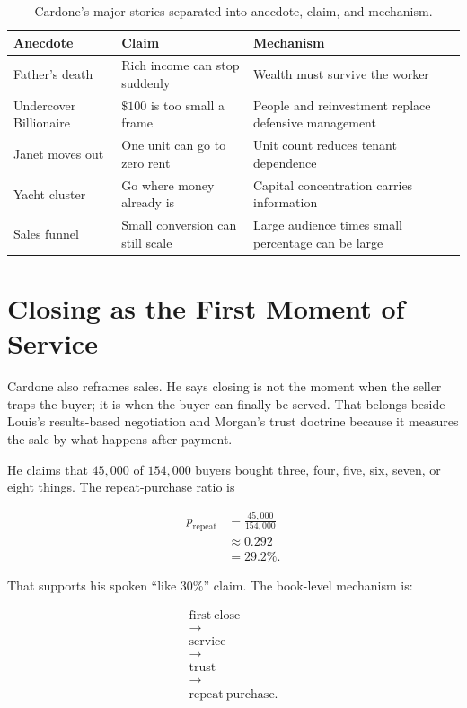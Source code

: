 \documentclass[11pt,oneside]{book}
\begin{document}
\begin{table}
\centering
\begin{tabular}{p{.22\linewidth}p{.32\linewidth}p{.34\linewidth}}
\hline
Anecdote & Claim & Mechanism\\
\hline
Father's death & Rich income can stop suddenly & Wealth must survive the worker\\
\hline
Undercover Billionaire & \(\$100\) is too small a frame & People and reinvestment replace defensive management\\
\hline
Janet moves out & One unit can go to zero rent & Unit count reduces tenant dependence\\
\hline
Yacht cluster & Go where money already is & Capital concentration carries information\\
\hline
Sales funnel & Small conversion can still scale & Large audience times small percentage can be large\\
\hline
\end{tabular}
\caption{Cardone's major stories separated into anecdote, claim, and mechanism.}
\end{table}

\section{Closing as the First Moment of Service}

Cardone also reframes sales. He says closing is not the moment when the seller traps the buyer; it is when the buyer can finally be served. That belongs beside Louis's results-based negotiation and Morgan's trust doctrine because it measures the sale by what happens after payment.

He claims that \(45{,}000\) of \(154{,}000\) buyers bought three, four, five, six, seven, or eight things. The repeat-purchase ratio is

\begin{align}
p_{\mathrm{repeat}}
&=
\frac{45{,}000}{154{,}000}\\
&\approx 0.292\\
&=29.2\%.
\end{align}

That supports his spoken ``like \(30\%\)'' claim. The book-level mechanism is:

\begin{equation}
\begin{gathered}
\mathrm{first\ close}\\
\longrightarrow\\
\mathrm{service}\\
\longrightarrow\\
\mathrm{trust}\\
\longrightarrow\\
\mathrm{repeat\ purchase}.
\end{gathered}
\end{equation}
\end{document}
